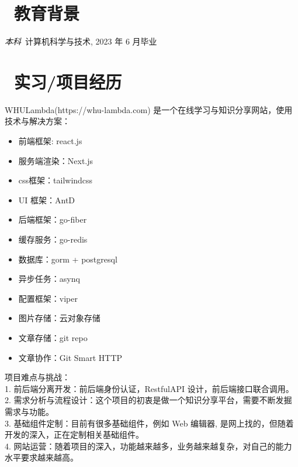 \documentclass{resume}
\begin{document}



\section{\faGraduationCap\  教育背景}
\textit{本科}\ 计算机科学与技术, 2023 年 6 月毕业

\section{\faUsers\ 实习/项目经历}

WHULambda(https://whu-lambda.com) 是一个在线学习与知识分享网站，使用技术与解决方案：
\begin{itemize}
  \item 前端框架: react.js
  \item 服务端渲染：Next.js
  \item css框架：tailwindcss
  \item UI 框架：AntD
  \item 后端框架：go-fiber
  \item 缓存服务：go-redis
  \item 数据库：gorm + postgresql
  \item 异步任务：asynq
  \item 配置框架：viper
  \item 图片存储：云对象存储
  \item 文章存储：git repo
  \item 文章协作：Git Smart HTTP
\end{itemize}

项目难点与挑战：\\
1. 前后端分离开发：前后端身份认证，RestfulAPI 设计，前后端接口联合调用。\\
2. 需求分析与流程设计：这个项目的初衷是做一个知识分享平台，需要不断发掘需求与功能。\\
3. 基础组件定制：目前有很多基础组件，例如 Web 编辑器, 是网上找的，但随着开发的深入，正在定制相关基础组件。\\
4. 网站运营：随着项目的深入，功能越来越多，业务越来越复杂，对自己的能力水平要求越来越高。
\end{document}
